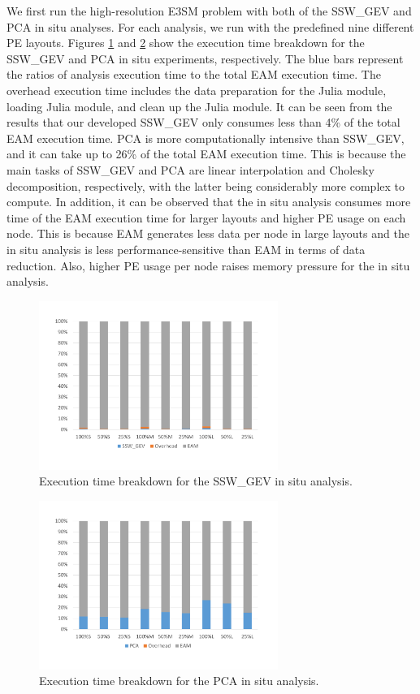 \documentclass{juliacon}
\begin{document}
We first run the high-resolution E3SM problem with both of the SSW\_GEV and PCA in situ analyses. For each analysis, we run with the predefined nine different PE layouts. Figures \ref{fig:ssw_break} and \ref{fig:pca_break} show the execution time breakdown for the SSW\_GEV and PCA in situ experiments, respectively. The blue bars represent the ratios of analysis execution time to the total EAM execution time. The overhead execution time includes the data preparation for the Julia module, loading Julia module, and clean up the Julia module. It can be seen from the results that our developed SSW\_GEV only consumes less than 4\% of the total EAM execution time. PCA is more computationally intensive than SSW\_GEV, and it can take up to 26\% of the total EAM execution time. This is because the main tasks of SSW\_GEV and PCA are linear interpolation and Cholesky decomposition, respectively, with the latter being considerably more complex to compute. In addition, it can be observed that the in situ analysis consumes more time of the EAM execution time for larger layouts and higher PE usage on each node. This is because EAM generates less data per node in large layouts and the in situ analysis is less performance-sensitive than EAM in terms of data reduction. Also, higher PE usage per node raises memory pressure for the in situ analysis.

\begin{figure}
    \centering
    \includegraphics[width=\linewidth, height=5.5cm]{figures/ssw_break.pdf}
    \caption{Execution time breakdown for the SSW\_GEV in situ analysis.}
    \label{fig:ssw_break}
\end{figure}


\begin{figure}
    \centering
    \includegraphics[width=\linewidth, height=5.5cm]{figures/pca_break.pdf}
    \caption{Execution time breakdown for the PCA in situ analysis.}
    \label{fig:pca_break}
\end{figure}
\end{document}
